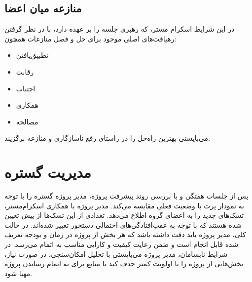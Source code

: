 \subsection{منازعه میان اعضا}
در این شرایط اسکرام مستر، که رهبری جلسه را بر عهده دارد، با در نظر گرفتن رهیافت‌های اصلی موجود برای حل و فصل منازعات همچون:
\begin{itemize}
	\item
	تطبیق‌یافتن
	\item 
	رقابت
	\item 
	اجتناب
		\item 
	همکاری
		\item 
	مصالحه
\end{itemize}
می‌بایستی بهترین راه‌حل را در راستای رفع ناسازگاری و منازعه برگزیند.
\section{مدیریت گستره}
پس از جلسات هفتگی و با بررسی روند پیشرفت پروژه، مدیر پروژه گستره را با توجه به نمودار پرت با وضعیت فعلی مقایسه می‌کند. مدیر پروژه با همکاری اسکرام‌مستر، تسک‌های جدید را به اعضای گروه اطلاع می‌دهد. تعدادی از این تسک‌ها از پیش تعیین شده هستند که با توجه به عقب‌افتادگی‌های احتمالی دستخور تغییر شده‌اند. \newline
در حالت کلی، مدیر پروژه باید دقت داشته باشد که هر بخش از پروژه در زمان و بودجه تعریف شده قابل انجام است و ضمن رعایت کیفیت و کارایی مناسب به اتمام می‌رسد.
در شرایط نابسامان، مدیر پروژه می‌بایستی با تحلیل امکان‌سنجی، در صورت نیاز، بخش‌هایی از پروژه را با اولویت کمتر حذف کند تا منابع برای به اتمام رساندن پروژه مهیا شود.